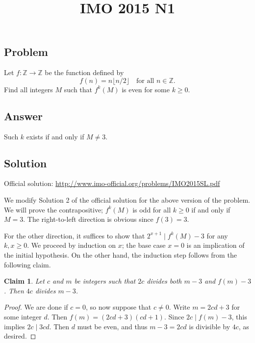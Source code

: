 \documentclass{article}
\title{IMO 2015 N1}
\author{}
\date{}
\newcommand{\Z}{\mathbb{Z}}
\newtheorem*{claim}{Claim}
\begin{document}
\maketitle



\subsection*{Problem}

Let $f : \Z \to \Z$ be the function defined by
\[ f(n) = n \lfloor n/2 \rfloor \quad \text{for all } n \in \Z. \]
Find all integers $M$ such that $f^k(M)$ is even for some $k \geq 0$.



\subsection*{Answer}

Such $k$ exists if and only if $M \neq 3$.



\subsection*{Solution}

Official solution: \url{http://www.imo-official.org/problems/IMO2015SL.pdf}

We modify Solution 2 of the official solution for the above version of the problem.
We will prove the contrapositive; $f^k(M)$ is odd for all $k \geq 0$ if and only if $M = 3$.
The right-to-left direction is obvious since $f(3) = 3$.

For the other direction, it suffices to show that $2^{x + 1} \mid f^k(M) - 3$ for any $k, x \geq 0$.
We proceed by induction on $x$; the base case $x = 0$ is an implication of the initial hypothesis.
On the other hand, the induction step follows from the following claim.

\begin{claim}
Let $c$ and $m$ be integers such that $2c$ divides both $m - 3$ and $f(m) - 3$.
Then $4c$ divides $m - 3$.
\end{claim}
\begin{proof}
We are done if $c = 0$, so now suppose that $c \neq 0$.
Write $m = 2cd + 3$ for some integer $d$.
Then $f(m) = (2cd + 3)(cd + 1)$.
Since $2c \mid f(m) - 3$, this implies $2c \mid 3cd$.
Then $d$ must be even, and thus $m - 3 = 2cd$ is divisible by $4c$, as desired.
\end{proof}
\end{document}
